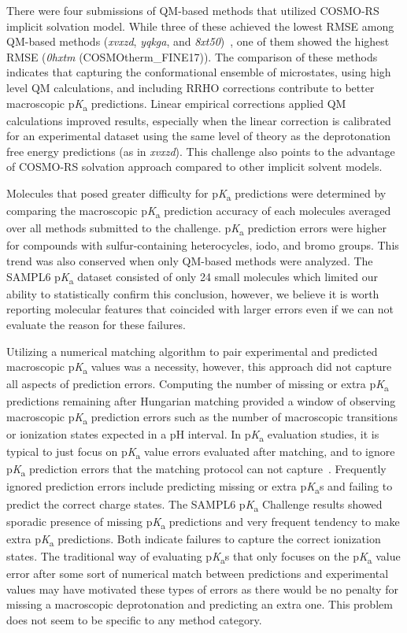 \documentclass[9pt,lineno,final]{elife}
\newcommand{\pKa}{p\textit{K}\textsubscript{a}}
\begin{document}
There were four submissions of QM-based methods that utilized COSMO-RS implicit solvation model. 
While three of these achieved the lowest RMSE among QM-based methods (\textit{xvxzd}, \textit{yqkga}, and \textit{8xt50})~\citep{Pracht:2018:J.Comput.AidedMol.Des.}, one of them showed the highest RMSE (\textit{0hxtm} (COSMOtherm\_FINE17)). 
The comparison of these methods indicates that capturing the conformational ensemble of microstates, using high level QM calculations, and including RRHO corrections contribute to better macroscopic \pKa{} predictions.
Linear empirical corrections applied QM calculations improved results, especially when the linear correction is calibrated for an experimental dataset using the same level of theory as the deprotonation free energy predictions (as in \textit{xvxzd}).
This challenge also points to the advantage of COSMO-RS solvation approach compared to other implicit solvent models.

Molecules that posed greater difficulty for \pKa{} predictions were determined by comparing the macroscopic \pKa{} prediction accuracy of each molecules averaged over all methods submitted to the challenge. 
\pKa{} prediction errors were higher for compounds with sulfur-containing heterocycles, iodo, and bromo groups. 
This trend was also conserved when only QM-based methods were analyzed. 
The SAMPL6 \pKa{} dataset consisted of only 24 small molecules which limited our ability to statistically confirm this conclusion, however, we believe it is worth reporting molecular features that coincided with larger errors even if we can not evaluate the reason for these failures. 

Utilizing a numerical matching algorithm to pair experimental and predicted macroscopic \pKa{} values was a necessity, however, this approach did not capture all aspects of prediction errors. 
Computing the number of missing or extra \pKa{} predictions remaining after Hungarian matching provided a window of observing macroscopic \pKa{} prediction errors such as the number of macroscopic transitions or ionization states expected in a pH interval. 
In \pKa{} evaluation studies, it is typical to just focus on \pKa{} value errors evaluated after matching, and to ignore \pKa{} prediction errors that the matching protocol can not capture~\citep{Balogh:2012:J.Pharm.Biomed.Anal.a, Settimo:2014:Pharm.Res.a, Meloun:2007:Anal.Bioanal.Chem., Liao:2009:J.Chem.Inf.Model., Manchester:2010:J.Chem.Inf.Model.}. 
Frequently ignored prediction errors include predicting missing or extra \pKa{}s and failing to predict the correct charge states. 
The SAMPL6 \pKa{} Challenge results showed sporadic presence of missing \pKa{} predictions and very frequent tendency to make extra \pKa{} predictions. 
Both indicate failures to capture the correct ionization states. 
The traditional way of evaluating \pKa{}s that only focuses on the \pKa{} value error after some sort of numerical match between predictions and experimental values may have motivated these types of errors as there would be no penalty for missing a macroscopic deprotonation and predicting an extra one. 
This problem does not seem to be specific to any method category.
\end{document}
